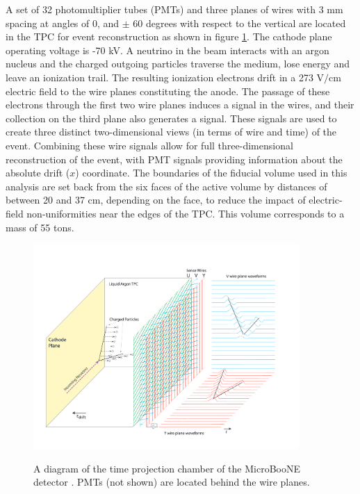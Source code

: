 \documentclass[a4paper,11pt]{article}
\begin{document}
A set of 32 photomultiplier tubes (PMTs) and three planes of wires with 3 mm spacing at angles of 0, and $\pm$ 60 degrees with respect to the vertical are located in the TPC for event reconstruction as shown in figure \ref{detector_fig}. The cathode plane operating voltage is -70 kV. A neutrino in the beam interacts with an argon nucleus and the charged outgoing particles traverse the medium, lose energy and leave an ionization trail. The resulting ionization electrons drift in a 273 $\text{V/cm}$ electric field to the wire planes constituting the anode. The passage of these electrons through the first two wire planes induces a signal in the wires, and their collection on the third plane also generates a signal. These signals are used to create three distinct two-dimensional views (in terms of wire and time) of the event. Combining these wire signals allow for full three-dimensional reconstruction of the event, with PMT signals providing information about the absolute drift ($x$) coordinate. The boundaries of the fiducial volume used in this analysis are set back from the six faces of the active volume by distances of between 20 and 37 cm, depending on the face, to reduce the impact of electric-field non-uniformities near the edges of the TPC. This volume corresponds to a mass of 55 tons.\\

\begin{figure}[ht!]
\centering
	\includegraphics[width=0.9\textwidth]{Figures/static_figs/detector2.png} \\
\caption{A diagram of the time projection chamber of the MicroBooNE detector \cite{ub_detectorpaper}. PMTs (not shown) are located behind the wire planes.}\label{detector_fig}
\end{figure}
\end{document}
